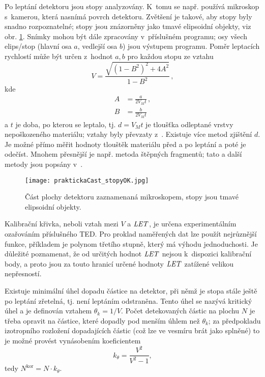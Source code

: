 Po leptání detektoru jsou stopy analyzovány. K~tomu se např. používá mikroskop s~kamerou, která nasnímá povrch detektoru. Zvětšení je takové, aby stopy byly snadno rozpoznatelné; stopy jsou znázorněny jako tmavé elipsoidní objekty, viz obr. \ref{fig:detektory_stopy}. Snímky mohou být dále zpracovány v~příslušném programu; osy všech elips/stop (hlavní osa $a$, vedlejší osa $b$) jsou výstupem programu. 
Poměr leptacích rychlostí může být určen z~hodnot $a,b$ pro každou stopu ze vztahu
\begin{equation}
  V=\frac{\sqrt{\left( 1-B^2 \right)^2+4A^2}}{1-B^2}\,,
  \label{eq:pomerLepRychlosti}
\end{equation}
kde
\begin{align*}
  A&=\frac{a}{2V_Mt}\,,\\
  B&=\frac{b}{2V_Mt}
\end{align*}
a $t$ je doba, po kterou se leptalo, tj. $d=V_Mt$ je tloušťka odleptané vrstvy nepoškozeného materiálu; vztahy byly převzaty z~\cite{ssntd}. Existuje více metod zjištění $d$. Je možné přímo měřit hodnoty tlouštěk materiálu před a po leptání a poté je odečíst. Mnohem přesnější je např. metoda štěpných fragmentů; tato a další metody jsou popsány v~\cite{thesisKPBrabcova}.    
\begin{figure}[ht]
  \centering
  \texttt{[image: praktickaCast\_stopyOK.jpg]}
  \caption{Část plochy detektoru zaznamenaná mikroskopem, stopy jsou tmavé elipsoidní objekty.}
  \label{fig:detektory_stopy}
\end{figure}

Kalibrační křivka, neboli vztah mezi $V$ a $\mathit{LET}$, je určena experimentálním ozařováním příslušného TED. Pro proklad naměřených dat lze použít nejrůznější funkce, příkladem je polynom třetího stupně, který má výhodu jednoduchosti. Je důležité poznamenat, že od určitých hodnot $\mathit{LET}$ nejsou k~dispozici kalibrační body, a proto jsou za touto hranicí určené hodnoty $\mathit{LET}$ zatížené velikou nepřesností.

Existuje minimální úhel dopadu částice na detektor, při němž je stopa stále ještě po leptání zřetelná, tj. není leptáním odstraněna. Tento úhel se nazývá kritický úhel a je definován vztahem $\theta_k=1/V$. Počet detekovaných částic na plochu $N$ je třeba opravit na částice, které dopadly pod menším úhlem než $\theta_k$; za předpokladu izotropního rozložení dopadajících částic (což lze ve vesmíru brát jako splněné) to je možné provést vynásobením koeficientem 
\begin{equation}
  k_{\theta}=\frac{V^2}{V^2-1},
  \label{eq:kritickyUhel}
\end{equation}
tedy $N^{\text{kor}}=N\cdot k_{\theta}$. 

